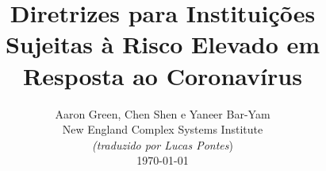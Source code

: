 \documentclass[onecolumn,journal]{IEEEtran}
\begin{document}
\title{\color{Brown}  Diretrizes para Instituições Sujeitas à Risco Elevado em Resposta ao Coronavírus
\vspace{-0.35ex}}
\author{Aaron Green, Chen Shen e Yaneer Bar-Yam \\ New England Complex Systems Institute \\
\vspace{+0.35ex}
\small{\textit{(traduzido por Lucas Pontes})}\\
 \today
  \vspace{-8ex} \\
\textbf{}
 }

\maketitle




\thispagestyle{empty} %




\end{document}
